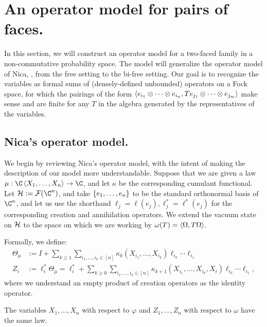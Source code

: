 \section{An operator model for pairs of faces.}
In this section, we will construct an operator model for a two-faced family in a non-commutative probability space.
The model will generalize the operator model of Nica, \cite{Nica1996271}, from the free setting to the bi-free setting.
Our goal is to recognize the variables as formal sums of (densely-defined unbounded) operators on a Fock space, for which the pairings of the form $\left\langle e_{i_1}\otimes\cdots\otimes e_{i_n}, Te_{j_1}\otimes\cdots\otimes e_{j_m}\right\rangle$ make sense and are finite for any $T$ in the algebra generated by the representatives of the variables.

\subsection{Nica's operator model.}
We begin by reviewing Nica's operator model, with the intent of making the description of our model more understandable.
Suppose that we are given a law $\mu : \C\ang{X_1, \ldots, X_n} \to \C$, and let $\kappa$ be the corresponding cumulant functional.
Let $\cH := \cF(\C^n)$, and take $\left\{e_1, \ldots, e_n\right\}$ to be the standard orthonormal basis of $\C^n$, and let us use the shorthand $\ell_j = \ell(e_j), \ell_j^* = \ell^*(e_j)$ for the corresponding creation and annihilation operators.
We extend the vacuum state on $\mathcal{H}$ to the space on which we are working by $\omega(T) = \left\langle\Omega, T\Omega\right\rangle$.

Formally, we define:
\begin{align*}
	\Theta_\mu &:= I + \sum_{k\geq1} \sum_{i_1, \ldots, i_k \in [n]} \kappa_k(X_{i_1}, \ldots, X_{i_k}) \ell_{i_k}\cdots \ell_{i_1} \\
	Z_i &:= \ell_i^*\Theta_\mu = \ell_i^* + \sum_{k\geq 0} \sum_{i_1, \ldots, i_k \in [n]} \kappa_{k+1}(X_{i_1}, \ldots, X_{i_k}, X_i) \ell_{i_k}\cdots \ell_{i_1},
\end{align*}
where we understand an empty product of creation operators as the identity operator.

\begin{proposition}
	The variables $X_1, \ldots, X_n$ with respect to $\varphi$ and $Z_1, \ldots, Z_n$ with respect to $\omega$ have the same law.
\end{proposition}

